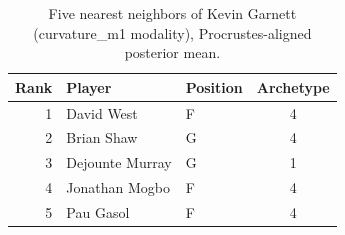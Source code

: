 \begin{table}[htbp]
  \centering\small
  \begin{tabular}{rllc}
    \toprule
    Rank & Player & Position & Archetype \\
    \midrule
    1 & David West & F & 4 \\
    2 & Brian Shaw & G & 4 \\
    3 & Dejounte Murray & G & 1 \\
    4 & Jonathan Mogbo & F & 4 \\
    5 & Pau Gasol & F & 4 \\
    \bottomrule
  \end{tabular}
  \caption{Five nearest neighbors of Kevin Garnett (curvature_m1 modality), Procrustes-aligned posterior mean.}
  \label{tab:Kevin_Garnett_neighbors_curvature_m1}
\end{table}


